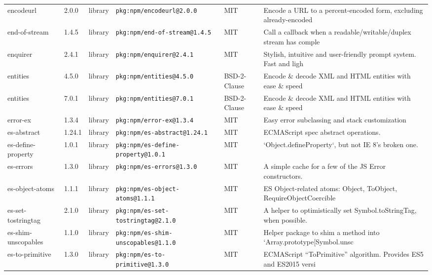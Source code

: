 \documentclass[11pt,a4paper]{article}
\begin{document}
\begin{longtable}{|p{4cm}|p{2cm}|p{1.6cm}|p{5cm}|p{1.5cm}|p{3.5cm}|}
\raggedright encodeurl & 2.0.0 & library & \small\texttt{pkg:npm/encodeurl@2.0.0} & MIT & \small Encode a URL to a percent-encoded form, excluding already-encoded \\
\raggedright end-of-stream & 1.4.5 & library & \small\texttt{pkg:npm/end-of-stream@1.4.5} & MIT & \small Call a callback when a readable/writable/duplex stream has comple \\
\raggedright enquirer & 2.4.1 & library & \small\texttt{pkg:npm/enquirer@2.4.1} & MIT & \small Stylish, intuitive and user-friendly prompt system. Fast and ligh \\
\raggedright entities & 4.5.0 & library & \small\texttt{pkg:npm/entities@4.5.0} & BSD-2-Clause & \small Encode \& decode XML and HTML entities with ease \& speed \\
\raggedright entities & 7.0.1 & library & \small\texttt{pkg:npm/entities@7.0.1} & BSD-2-Clause & \small Encode \& decode XML and HTML entities with ease \& speed \\
\raggedright error-ex & 1.3.4 & library & \small\texttt{pkg:npm/error-ex@1.3.4} & MIT & \small Easy error subclassing and stack customization \\
\raggedright es-abstract & 1.24.1 & library & \small\texttt{pkg:npm/es-abstract@1.24.1} & MIT & \small ECMAScript spec abstract operations. \\
\raggedright es-define-property & 1.0.1 & library & \small\texttt{pkg:npm/es-define-property@1.0.1} & MIT & \small `Object.defineProperty`, but not IE 8's broken one. \\
\raggedright es-errors & 1.3.0 & library & \small\texttt{pkg:npm/es-errors@1.3.0} & MIT & \small A simple cache for a few of the JS Error constructors. \\
\raggedright es-object-atoms & 1.1.1 & library & \small\texttt{pkg:npm/es-object-atoms@1.1.1} & MIT & \small ES Object-related atoms: Object, ToObject, RequireObjectCoercible \\
\raggedright es-set-tostringtag & 2.1.0 & library & \small\texttt{pkg:npm/es-set-tostringtag@2.1.0} & MIT & \small A helper to optimistically set Symbol.toStringTag, when possible. \\
\raggedright es-shim-unscopables & 1.1.0 & library & \small\texttt{pkg:npm/es-shim-unscopables@1.1.0} & MIT & \small Helper package to shim a method into `Array.prototype[Symbol.unsc \\
\raggedright es-to-primitive & 1.3.0 & library & \small\texttt{pkg:npm/es-to-primitive@1.3.0} & MIT & \small ECMAScript “ToPrimitive” algorithm. Provides ES5 and ES2015 versi \\

\end{longtable}
\end{document}

